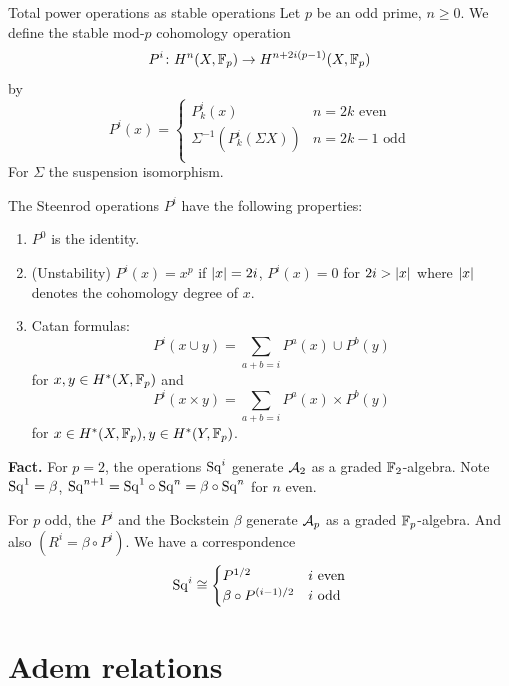 \documentclass[language=english]{TemplateLecture}
\begin{document}

\begin{defi}{Total power operations as stable operations}{}
    Let \(p\) be an odd prime, \(n \geq 0\). We define the stable mod-\(p\) cohomology operation
    \[P^i\colon H^n(X, \mathbb{F}_p) \to H^{n+2i(p-1)}(X, \mathbb{F}_p)\]
    by
    \[P^i(x) = \begin{cases}
        P^i_k(x) & n = 2k \text{ even} \\
        \Sigma^{-1}(P^i_k(\Sigma X)) & n = 2k-1 \text{ odd} \\
    \end{cases}\]
    For \(\Sigma\) the suspension isomorphism.
\end{defi}

\begin{thm}{}{}
    The Steenrod operations \(P^i\) have the following properties:
    \begin{enumerate}
        \item \(P^0\) is the identity.
        \item (Unstability) \(P^i(x) = x^p\) if \(\lvert x\rvert = 2i\), \(P^i(x)= 0\) for \(2i > \lvert x\rvert\) where \(\lvert x\rvert\) denotes the cohomology degree of \(x\).
        \item Catan formulas:
        \[P^i(x\cup y) = \sum_{a+b = i} P^a(x)\cup P^b(y)\]
        for \(x,y \in H^*(X, \mathbb{F}_p)\) and
        \[P^i(x\times y) = \sum_{a+b = i} P^a(x)\times P^b(y)\]
        for \(x \in H^*(X, \mathbb{F}_p), y \in H^*(Y, \mathbb{F}_p)\).
    \end{enumerate}
\end{thm}

\textbf{Fact.} For \(p = 2\), the operations \(\mathrm{Sq}^i\) generate \(\mathcal{A}_2\) as a graded \(\mathbb{F}_2\)-algebra. Note \(\mathrm{Sq}^1 = \beta\), \(\mathrm{Sq}^{n+1} = \mathrm{Sq}^1 \circ \mathrm{Sq}^n = \beta \circ \mathrm{Sq}^n\) for \(n\) even.

For \(p\) odd, the \(P^i\) and the Bockstein \(\beta\) generate \(\mathcal{A}_p\) as a graded \(\mathbb{F}_p\)-algebra. And also \((R^i = \beta \circ P^i)\). We have a correspondence
\[\mathrm{Sq}^i \cong \begin{cases}
    P^{1/2} & i \text{ even} \\
    \beta\circ P^{(i-1)/2} & i \text{ odd} \\
\end{cases}\]


\section{Adem relations}
\end{document}

